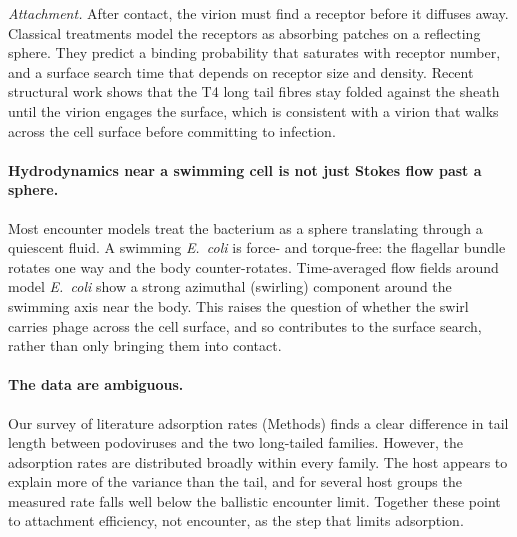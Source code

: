 \documentclass[12pt]{article}
\begin{document}
\emph{Attachment.} After contact, the virion must find a receptor before it diffuses away. Classical treatments model the receptors as absorbing patches on a reflecting sphere\cite{berg1977physics}. They predict a binding probability that saturates with receptor number, and a surface search time that depends on receptor size and density\cite{berg1977physics,schwartz1976adsorption}. Recent structural work shows that the T4 long tail fibres stay folded against the sheath until the virion engages the surface, which is consistent with a virion that walks across the cell surface before committing to infection\cite{hu2015structural}.

\paragraph{Hydrodynamics near a swimming cell is not just Stokes flow past a sphere.} Most encounter models treat the bacterium as a sphere translating through a quiescent fluid. A swimming \textit{E.~coli} is force- and torque-free: the flagellar bundle rotates one way and the body counter-rotates\cite{berg2004coli,lauga2016bacterial}. Time-averaged flow fields around model \textit{E.~coli} show a strong azimuthal (swirling) component around the swimming axis near the body\cite{watari2010hydrodynamics,lauga2016bacterial}. This raises the question of whether the swirl carries phage across the cell surface, and so contributes to the surface search, rather than only bringing them into contact.

\paragraph{The data are ambiguous.} Our survey of literature adsorption rates (Methods) finds a clear difference in tail length between podoviruses and the two long-tailed families. However, the adsorption rates are distributed broadly within every family. The host appears to explain more of the variance than the tail, and for several host groups the measured rate falls well below the ballistic encounter limit. Together these point to attachment efficiency, not encounter, as the step that limits adsorption\cite{edwards2021making}.
\end{document}
